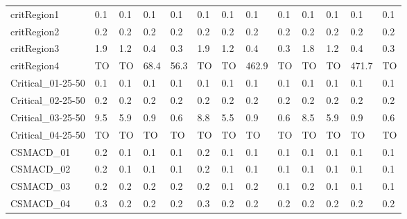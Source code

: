 \begin{table}
\begin{adjustbox}{max totalheight=\textheight}
\begin{tabular}{|l|llllllllllll|}
    critRegion1        & 0.1      & 0.1      & 0.1      & 0.1      & 0.1   & 0.1  & 0.1   & 0.1  & 0.1               & 0.1               & 0.1               & 0.1               \\
    critRegion2        & 0.2      & 0.2      & 0.2      & 0.2      & 0.2   & 0.2  & 0.2   & 0.2  & 0.2               & 0.2               & 0.2               & 0.2               \\
    critRegion3        & 1.9      & 1.2      & 0.4      & 0.3      & 1.9   & 1.2  & 0.4   & 0.3  & 1.8               & 1.2               & 0.4               & 0.3               \\
    critRegion4        & TO       & TO       & 68.4     & 56.3     & TO    & TO   & 462.9 & TO   & TO                & TO                & 471.7             & TO                \\ \hline
    Critical\_01-25-50 & 0.1      & 0.1      & 0.1      & 0.1      & 0.1   & 0.1  & 0.1   & 0.1  & 0.1               & 0.1               & 0.1               & 0.1               \\
    Critical\_02-25-50 & 0.2      & 0.2      & 0.2      & 0.2      & 0.2   & 0.2  & 0.2   & 0.2  & 0.2               & 0.2               & 0.2               & 0.2               \\
    Critical\_03-25-50 & 9.5      & 5.9      & 0.9      & 0.6      & 8.8   & 5.5  & 0.9   & 0.6  & 8.5               & 5.9               & 0.9               & 0.6               \\
    Critical\_04-25-50 & TO       & TO       & TO       & TO       & TO    & TO   & TO    & TO   & TO                & TO                & TO                & TO                \\ \hline
    CSMACD\_01         & 0.2      & 0.1      & 0.1      & 0.1      & 0.2   & 0.1  & 0.1   & 0.1  & 0.1               & 0.1               & 0.1               & 0.1               \\
    CSMACD\_02         & 0.2      & 0.1      & 0.1      & 0.1      & 0.2   & 0.1  & 0.1   & 0.1  & 0.1               & 0.1               & 0.1               & 0.1               \\
    CSMACD\_03         & 0.2      & 0.2      & 0.2      & 0.2      & 0.2   & 0.1  & 0.2   & 0.1  & 0.2               & 0.1               & 0.1               & 0.1               \\
    CSMACD\_04         & 0.3      & 0.2      & 0.2      & 0.2      & 0.3   & 0.2  & 0.2   & 0.2  & 0.2               & 0.2               & 0.2               & 0.2               \\

\end{tabular}
\end{adjustbox}
\end{table}
